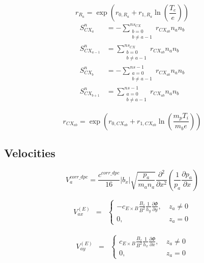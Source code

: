 \documentclass[a4paper,10pt]{report}
\begin{document}
\begin{equation}
r_{R_a}=\exp\left(r_{0,R_a}+r_{1,R_a} \ln\left(\frac{T_e}e\right)\right)
\end{equation}
\begin{eqnarray}
S_{CX_a}^n & = - \sum \limits^{ns_{CX}}_{\substack{b=0 \\ b \neq a-1}} r_{CX_{ab}} n_a n_b \\
S_{CX_{a-1}}^n & = \sum \limits^{ns_{CX}}_{\substack{b=0 \\ b \neq a-1}} r_{CX_{ab}} n_a n_b \\
S_{CX_b}^n & = - \sum \limits^{ns-1}_{\substack{a=0 \\ b \neq a-1}} r_{CX_{ab}} n_a n_b \\
S_{CX_{b+1}}^n & = \sum \limits^{ns-1}_{\substack{a=0 \\ b \neq a-1}} r_{CX_{ab}} n_a n_b
\end{eqnarray}

\begin{equation}
r_{CX_{ab}} = \exp \left(
	r_{0,CX_{ab}} + r_{1,CX_{ab}} \ln  \left(
		\frac{m_p T_i} {m_b e}
	\right)
\right)
\end{equation}

\subsection{Velocities}

\begin{equation}
V_a^{corr\_dpc} = \frac{c^{corr\_dpc}}{16} |b_x| \sqrt{\frac{p_a}{m_a n_a}} \frac{\partial
^2}{\partial x^2} \left( \frac 1{p_a} \frac{\partial p_a}{\partial x} \right)
\end{equation}

\begin{equation}
\begin{matrix}
V_{ax}^{\left( E\right)} & =
& \left\{
\begin{matrix}
-c_{E\times B}   \frac{B_z}{B^2}   \frac 1{h_y}  \frac{\partial \Phi }{\partial y}, & \ z_a \neq 0 \\
0, & \ z_a = 0
\end{matrix} \right.
\end{matrix}
\end{equation}

\begin{equation}
\begin{matrix}
V_{ay}^{\left( E \right)} & =
& \left\{
\begin{matrix}
c_{E\times B}   \frac{B_z}{B^2}   \frac 1{h_x}   \frac{\partial \Phi }{\partial x}, & \ z_a \neq 0 \\
0, & \ z_a = 0
\end{matrix} \right.
\end{matrix}
\end{equation}
\end{document}
